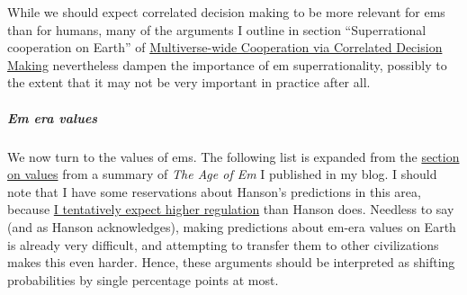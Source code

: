 \documentclass[]{article}
\let\oldsubparagraph\subparagraph
\renewcommand{\subparagraph}[1]{\oldsubparagraph{#1}\mbox{}}
\begin{document}
While we should expect correlated decision making to be more relevant
for ems than for humans, many of the arguments I outline in section
``Superrational cooperation on Earth'' of
\href{https://foundational-research.org/files/Multiverse-wide-Cooperation-via-Correlated-Decision-Making.pdf}{Multiverse-wide Cooperation via
Correlated Decision Making} 
nevertheless dampen the importance of em
superrationality, possibly to the extent that it may not be very
important in practice after all.

\subparagraph{Em era values}\label{em-era-values}

We now turn to the values of ems. The following list is expanded from
the
\href{https://casparoesterheld.com/2016/08/30/the-age-of-em-summary-of-policy-relevant-information/\#Values}{section
on values} from a summary of \emph{The Age of Em} I published in my blog.
I should note that I have some reservations about Hanson's predictions
in this area, because
\href{https://casparoesterheld.com/2016/08/30/the-age-of-em-summary-of-policy-relevant-information/\#regulation}{I
tentatively expect higher regulation} than Hanson does. Needless to say
(and as Hanson acknowledges), making predictions about em-era values on
Earth is already very difficult, and attempting to transfer them to
other civilizations makes this even harder. Hence, these arguments
should be interpreted as shifting probabilities by single percentage
points at most.
\end{document}
